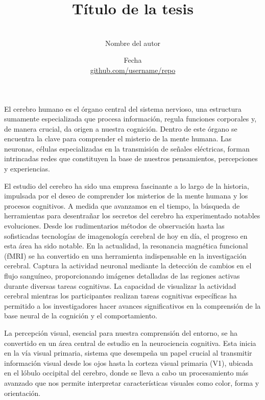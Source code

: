 \documentclass[12pt,oneside]{uhthesis}
\title{Título de la tesis}
\author{\\\vspace{0.25cm}Nombre del autor}
\date{Fecha\\\vspace{0.25cm}\href{https://github.com/username/repo}{github.com/username/repo}}
\begin{document}
\frontmatter
\maketitle







\mainmatter



El cerebro humano es el órgano central del sistema nervioso, una estructura sumamente especializada que procesa información, regula funciones corporales y, de manera crucial, da origen a nuestra cognición. Dentro de este órgano se encuentra la clave para comprender el misterio de la mente humana. Las neuronas, células especializadas en la transmisión de señales eléctricas, forman intrincadas redes que constituyen la base de nuestros pensamientos, percepciones y experiencias.

El estudio del cerebro ha sido una empresa fascinante a lo largo de la historia, impulsada por el deseo de comprender los misterios de la mente humana y los procesos cognitivos. A medida que avanzamos en el tiempo, la búsqueda de herramientas para desentrañar los secretos del cerebro ha experimentado notables evoluciones. Desde los rudimentarios métodos de observación hasta las sofisticadas tecnologías de imagenología cerebral de hoy en día, el progreso en esta área ha sido notable. En la actualidad, la resonancia magnética funcional (fMRI) se ha convertido en una herramienta indispensable en la investigación cerebral. Captura la actividad neuronal mediante la detección de cambios en el flujo sanguíneo, proporcionando imágenes detalladas de las regiones activas durante diversas tareas cognitivas. La capacidad de visualizar la actividad cerebral mientras los participantes realizan tareas cognitivas específicas ha permitido a los investigadores hacer avances significativos en la comprensión de la base neural de la cognición y el comportamiento.

La percepción visual, esencial para nuestra comprensión del entorno, se ha convertido en un área central de estudio en la neurociencia cognitiva. Esta inicia en la vía visual primaria, sistema que desempeña un papel crucial al transmitir información visual desde los ojos hasta la corteza visual primaria (V1), ubicada en el lóbulo occipital del cerebro, donde se lleva a cabo un procesamiento más avanzado que nos permite interpretar características visuales como color, forma y orientación.
\end{document}
